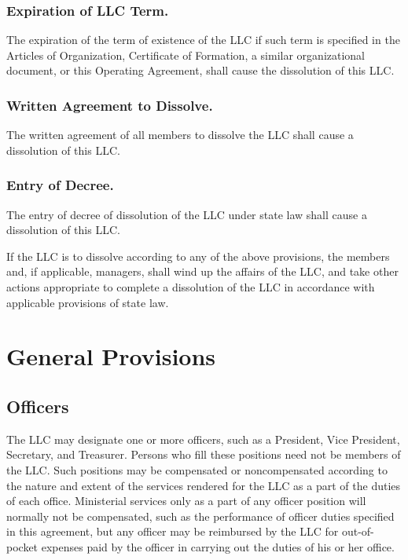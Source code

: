 \documentclass{article}
\begin{document}
				\subsubsection{Expiration of LLC Term.}
				The expiration of the term of existence of the LLC if such term is specified in the Articles of Organization, Certificate of Formation, a similar organizational document, or this Operating Agreement, shall cause the dissolution of this LLC.
				
				\subsubsection{Written Agreement to Dissolve.}
				The written agreement of all members to dissolve the LLC shall cause a dissolution of this LLC.

				\subsubsection{Entry of Decree.}
				The entry of decree of dissolution of the LLC under state law shall cause a dissolution of this LLC.

			If the LLC is to dissolve according to any of the above provisions, the members and, if applicable, managers, shall wind up the affairs of the LLC, and take other actions appropriate to complete a dissolution of the LLC in accordance with applicable provisions of state law.

		\section{General Provisions}

			\subsection{Officers}
			The LLC may designate one or more officers, such as a President, Vice President, Secretary, and Treasurer. Persons who fill these positions need not be members of the LLC. Such positions may be compensated or noncompensated according to the nature and extent of the services rendered for the LLC as a part of the duties of each office. Ministerial services only as a part of any officer position will normally not be compensated, such as the performance of officer duties specified in this agreement, but any officer may be reimbursed by the LLC for out-of-pocket expenses paid by the officer in carrying out the duties of his or her office.
\end{document}
